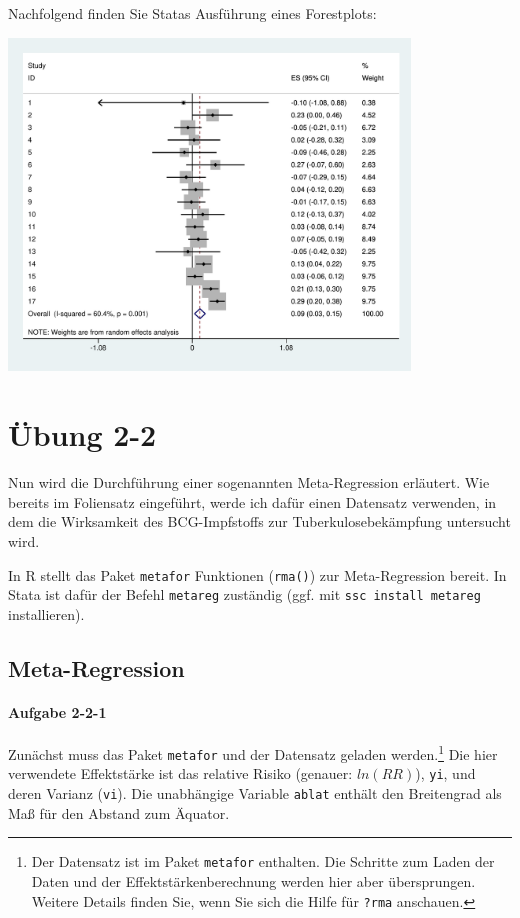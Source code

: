 \documentclass[normalheadings, 10pt]{scrartcl}\usepackage{graphicx, color}
\newcommand{\code}[1]{\texttt{#1}}
\begin{document}
Nachfolgend finden Sie Statas Ausführung eines Forestplots:

\begin{center}
  \includegraphics[width=0.8\textwidth]{f_stata_forestplot}
\end{center}

\pagebreak

\section{Übung 2-2}

Nun wird die Durchführung einer sogenannten
Meta-Regression erläutert. Wie bereits im Foliensatz eingeführt, werde ich dafür
einen Datensatz verwenden, in dem die Wirksamkeit des BCG-Impfstoffs zur
Tuberkulosebekämpfung untersucht wird.

In R stellt das Paket \code{metafor} Funktionen (\code{rma()}) zur Meta-Regression bereit. In
Stata ist dafür der Befehl \code{metareg} zuständig (ggf. mit \code{ssc install
  metareg} installieren).


\subsection{Meta-Regression}

\paragraph{Aufgabe 2-2-1} Zunächst muss das Paket \code{metafor} und der
Datensatz geladen werden.\footnote{Der Datensatz ist im Paket \code{metafor}
  enthalten. Die Schritte zum Laden der Daten und der Effektstärkenberechnung
  werden hier aber übersprungen. Weitere Details finden Sie, wenn Sie sich die
  Hilfe für \code{?rma} anschauen.} Die hier verwendete Effektstärke ist das
relative Risiko (genauer: $ln(RR)$), \code{yi}, und deren Varianz
(\code{vi}). Die unabhängige Variable \code{ablat} enthält den Breitengrad als
Maß für den Abstand zum Äquator.
\end{document}
